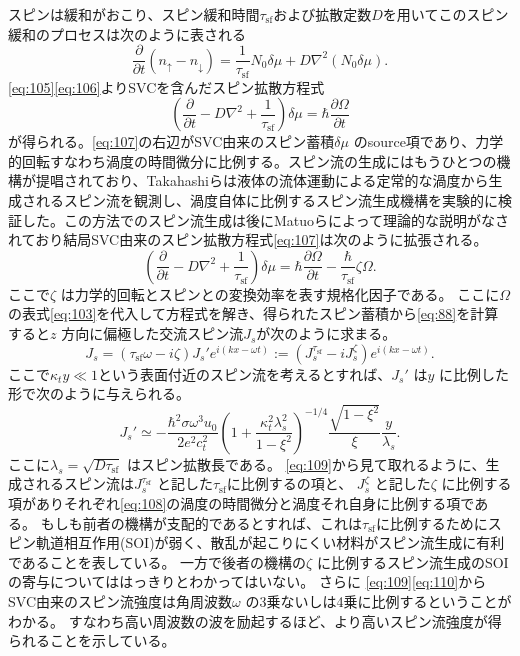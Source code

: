 \documentclass[dvipdfmx]{jsreport}
\numberwithin{equation}{chapter}
\numberwithin{table}{chapter}
\begin{document}
スピンは緩和がおこり、スピン緩和時間$\tau_\text{sf} $および拡散定数$D$を用いてこのスピン緩和のプロセスは次のように表される
\begin{equation}
\label{eq:106}
	\frac{\partial }{\partial t} (n_{\uparrow}-n_{\downarrow})=\frac{1}{\tau_\text{sf} }N_0\delta\mu+D \nabla ^2(N_0\delta\mu)
.\end{equation}
\eqref{eq:105}\eqref{eq:106}よりSVCを含んだスピン拡散方程式
\begin{equation}
\label{eq:107}
\left( \frac{\partial }{\partial t} -D \nabla ^2+\frac{1}{\tau_\text{sf} } \right) \delta\mu=\hbar\frac{\partial  \Omega}{\partial t} 
\end{equation}
が得られる。\eqref{eq:107}の右辺がSVC由来のスピン蓄積$\delta\mu$ のsource項であり、力学的回転すなわち渦度の時間微分に比例する。スピン流の生成にはもうひとつの機構が提唱されており、Takahashiらは液体の流体運動による定常的な渦度から生成されるスピン流を観測し、渦度自体に比例するスピン流生成機構を実験的に検証した\cite{TakahashiR2016Shg}。この方法でのスピン流生成は後にMatuoらによって理論的な説明がなされており結局SVC由来のスピン拡散方程式\eqref{eq:107}は次のように拡張される\cite{PhysRevB.102.174413,physrevb.96.020401}。
\begin{equation}
\label{eq:108}
\left( \frac{\partial }{\partial t} -D \nabla ^2+\frac{1}{\tau_\text{sf} } \right) \delta\mu=\hbar\frac{\partial \Omega}{\partial t} -\frac{\hbar}{\tau_\text{sf} }\zeta\Omega
.\end{equation}
ここで$\zeta$ は力学的回転とスピンとの変換効率を表す規格化因子である。
ここに$\Omega$ の表式\eqref{eq:103}を代入して方程式を解き、得られたスピン蓄積から\eqref{eq:88}を計算すると$z$ 方向に偏極した交流スピン流$J_s$が次のように求まる\cite{PhysRevLett.119.077202,PhysRevB.87.180402,PhysRevB.102.174413}。
\begin{equation}
\label{eq:109}
J_s=\left(\tau_\text{sf} \omega-i\zeta  \right) J_s'e^{i(kx-\omega t)}:=\left( J_s^{\tau_\text{sf}} -iJ_s^{\zeta} \right) e^{i(kx-\omega t)}
.\end{equation}
ここで$\kappa_t y\ll 1$という表面付近のスピン流を考えるとすれば、$J_s'$ は$y$ に比例した形で次のように与えられる。
\begin{equation}
\label{eq:110}
	J_s' \simeq -\frac{\hbar^2\sigma\omega^3u_0}{2e^2c_t^2}\left( 1+\frac{\kappa_t^2\lambda_s^2}{1-\xi^2} \right) ^{-1 /4} \frac{\sqrt{1-\xi^2} }{\xi}\frac{y}{\lambda_s}
.\end{equation}
ここに$\lambda_s=\sqrt{D \tau_\text{sf} } $ はスピン拡散長である。
\eqref{eq:109}から見て取れるように、生成されるスピン流は$J_s^{\tau_\text{sf} }$ と記した$\tau_\text{sf} $に比例するの項と、
$J_s^{\zeta}$ と記した$\zeta$ に比例する項がありそれぞれ\eqref{eq:108}の渦度の時間微分と渦度それ自身に比例する項である。
もしも前者の機構が支配的であるとすれば、これは$\tau_\text{sf} $に比例するためにスピン軌道相互作用(SOI)が弱く、散乱が起こりにくい材料がスピン流生成に有利であることを表している。
一方で後者の機構の$\zeta$ に比例するスピン流生成のSOIの寄与についてははっきりとわかってはいない。
さらに
\eqref{eq:109}\eqref{eq:110}からSVC由来のスピン流強度は角周波数$\omega$ の3乗ないしは4乗に比例するということがわかる。
すなわち高い周波数の波を励起するほど、より高いスピン流強度が得られることを示している。
\end{document}
